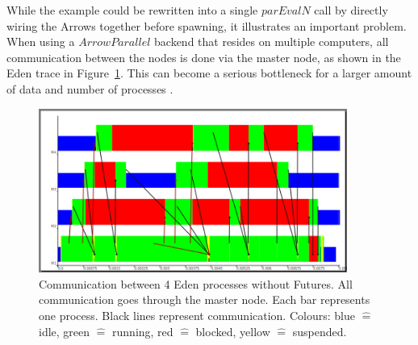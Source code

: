 \documentclass{jfp1}
\newcommand{\Conid}[1]{\mathit{#1}}
\newcommand{\Varid}[1]{\mathit{#1}}
\newcommand{\comm}[2]{}
\newcommand{\olcomment}[1]{\comm{OL}{#1}}
\newcommand{\mbcomment}[1]{\comm{MB}{#1}}
\begin{document}
While the example could be rewritten into a single \ensuremath{\Varid{parEvalN}} call by directly wiring the Arrows together before spawning, it illustrates an important problem. When using a \ensuremath{\Conid{ArrowParallel}} backend that resides on multiple computers, all communication between the nodes is done via the master node, as shown in the Eden trace in Figure~\ref{fig:withoutFutures}. This can become a serious bottleneck
for a larger amount of data and number of processes \citep[as e.g.][showcases]{Berthold2009-fft}.
\begin{figure}[ht]
	\centering
	\includegraphics[width=0.9\textwidth]{images/withoutFutures}
	\caption[without Futures]{Communication between 4 Eden processes without Futures. All communication goes through the master node. Each bar represents one process. Black lines represent communication. Colours: blue $\hat{=}$ idle, green $\hat{=}$ running, red  $\hat{=}$ blocked, yellow $\hat{=}$ suspended.}
	\label{fig:withoutFutures}
\end{figure}
\end{document}
